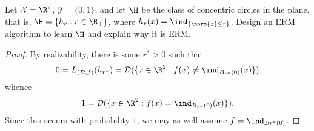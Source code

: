 \documentclass[12pt]{article}
\begin{document}
\begin{homeworkProblem}
  Let $ \mathcal{X} =\R^{2} $, $ \mathcal{Y}=\{0,1\} $, and let $ \H $ be the class of concentric circles in the plane, that is, $ \H = \{h_{r}:r\in \R_{+}\} $, where $ h_{r}(x) = \ind_{\{\norm{x}\leq r\}} $. Design an ERM algorithm to learn $ \H $ and explain why it is ERM.

\end{homeworkProblem}
\begin{proof}
  By realizability, there is some $ r^{*}>0 $ such that 
  \[
    0 = L_{(\mathcal{D},f)} (h_{r^{*}}) = \mathcal{D}  (\{x\in \R^{2} : f(x) \neq \ind_{B_{r^{*}}(0)}(x)\})
  \]
  whence 
  \[
    1 = \mathcal{D}  (\{x\in \R^{2} : f(x) = \ind_{B_{r^{*}}(0)}(x)\}).
  \]
  Since this occurs with probability $ 1 $, we may as well assume $ f = \ind_{B{r^{*}}(0)} $.


\end{proof}
\end{document}
